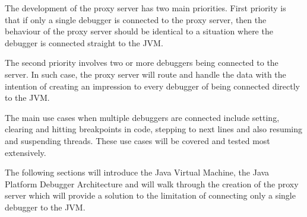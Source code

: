 \documentclass[..thesis.tex]{subfiles}
\begin{document}
The development of the proxy server has two main priorities. 
First priority is that if only a single debugger is connected to the proxy server, then the behaviour of the proxy server should be identical to a situation where the debugger is connected straight to the JVM.

The second priority involves two or more debuggers being connected to the server. 
In such case, the proxy server will route and handle the data with the intention of creating an impression to every debugger of being connected directly to the JVM.

The main use cases when multiple debuggers are connected include setting, clearing and hitting breakpoints in code, stepping to next lines and also resuming and suspending threads.
These use cases will be covered and tested most extensively.

The following sections will introduce the Java Virtual Machine, the Java Platform Debugger Architecture and will walk through the creation of the proxy server which will provide a solution to the limitation of connecting only a single debugger to the JVM.
\end{document}
